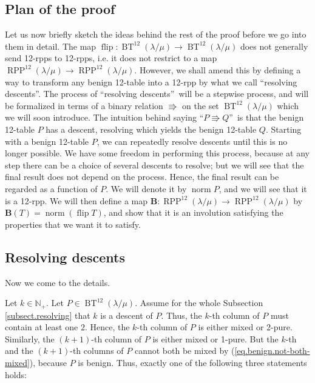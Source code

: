 \documentclass[numbers=enddot,12pt,final,onecolumn,notitlepage]{scrartcl}%
\theoremstyle{definition}
\def\OneTwoRPP{{\operatorname{RPP}^{12}\left(  \lambda/\mu\right)}}
\def\BenignTables{{\operatorname{BT}^{12}\left(  \lambda/\mu\right)}}
\begin{document}
\subsection{Plan of the proof}

Let us now briefly sketch the ideas behind the rest of the proof before we go
into them in detail. The map $\operatorname*{flip}:\BenignTables\rightarrow
\BenignTables$ does not generally send 12-rpps to 12-rpps, i.e. it does not
restrict to a map $\OneTwoRPP\rightarrow\OneTwoRPP$. However, we shall amend
this by defining a way to transform any benign 12-table into a 12-rpp by what
we call \textquotedblleft resolving descents\textquotedblright. The process of
\textquotedblleft resolving descents\textquotedblright\ will be a stepwise
process, and will be formalized in terms of a binary relation $\Rrightarrow$
on the set $\BenignTables$ which we will soon introduce. The intuition behind
saying \textquotedblleft$P\Rrightarrow Q$\textquotedblright\ is that the
benign 12-table $P$ has a descent, resolving which yields the benign 12-table
$Q$. Starting with a benign 12-table $P$, we can repeatedly resolve descents
until this is no longer possible. We have some freedom in
performing this process, because at any step there can be a choice of several
descents to resolve; but we will see that the final result does not depend on
the process. Hence, the final result can be regarded as a function of $P$. We
will denote it by $\operatorname*{norm}P$, and we will see that it is a
12-rpp. We will then define a map $\mathbf{B}:\OneTwoRPP\rightarrow\OneTwoRPP$
by $\mathbf{B}\left(  T\right)  =\operatorname*{norm}\left(
\operatorname*{flip}T\right)  $, and show that it is an involution satisfying
the properties that we want it to satisfy.

\subsection{\label{subsect.resolving}Resolving descents}

Now we come to the details.

Let $k\in\mathbb{N}_{+}$. Let $P\in\BenignTables$. Assume for the whole Subsection \ref{subsect.resolving} that $k$
is a descent of $P$. Thus, the $k$-th column of $P$ must contain at least one
$2$. Hence, the $k$-th column of $P$ is either mixed or 2-pure. Similarly, the
$\left(  k+1\right)  $-th column of $P$ is either mixed or 1-pure. But the
$k$-th and the $\left(  k+1\right)  $-th columns of $P$ cannot both be mixed by (\ref{eq.benign.not-both-mixed}), because $P$ is benign. Thus,
exactly one of the following three statements holds:
\end{document}
